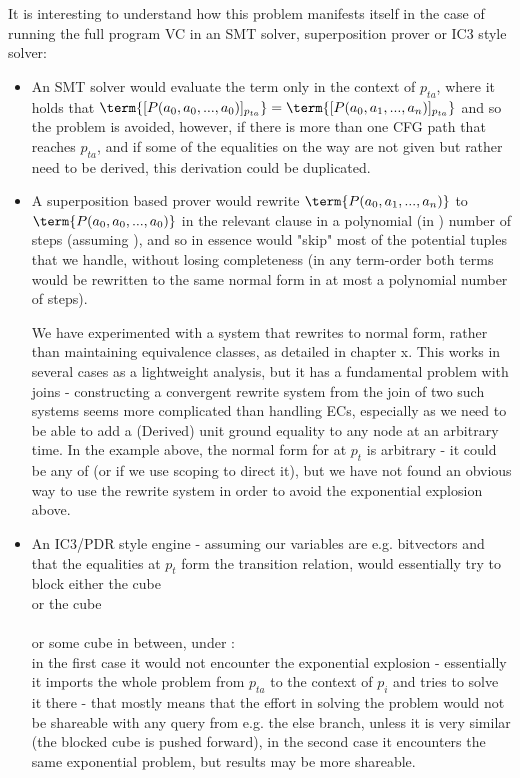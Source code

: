 It is interesting to understand how this problem manifests itself in the case of running the full program VC in an SMT solver, superposition prover or IC3 style solver:
\begin{itemize}
	\item An SMT solver would evaluate the term  only in the context of $p_{ta}$, where it holds that
	$\term{[P(a_0,a_0,...,a_0)]_{p_{ta}}}=\term{[P(a_0,a_1,...,a_n)]_{p_{ta}}}$ and so the problem is avoided, however, if there is more than one CFG path that reaches $p_{ta}$, and if some of the equalities on the way are not given but rather need to be derived, this derivation could be duplicated.
	\item A superposition based prover would rewrite $\term{P(a_0,a_1,...,a_n)}$ to \\ $\term{P(a_0,a_0,...,a_0)}$ in the relevant clause in a polynomial (in ) number of steps (assuming ), and so in essence would "skip" most of the potential tuples that we handle, without losing completeness (in any term-order both terms would be rewritten to the same normal form in at most a polynomial number of steps).
	
	We have experimented with a system that rewrites to normal form, rather than maintaining equivalence classes, as detailed in chapter x.
	This works in several cases as a lightweight analysis, but it has a fundamental problem with joins - constructing a convergent rewrite system from the join of two such systems seems more complicated than handling ECs, especially as we need to be able to add a (Derived) unit ground equality to any node at an arbitrary time. In the example above, the normal form for  at $p_t$ is arbitrary - it could be any of  (or  if we use scoping to direct it), but we have not found an obvious way to use the rewrite system in order to avoid the exponential explosion above.
		
	\item An IC3/PDR style engine - assuming our variables are e.g. bitvectors and that the equalities at $p_t$ form the transition relation, would essentially try to block either the cube \\
	 or the cube \\
	 \\
	or some cube in between, under  :\\
	in the first case it would not encounter the exponential explosion - essentially it imports the whole problem from $p_{ta}$ to the context of $p_i$ and tries to solve it there - that mostly means that the effort in solving the problem would not be shareable with any query from e.g. the else branch, unless it is very similar (the blocked cube is pushed forward), in the second case it encounters the same exponential problem, but results may be more shareable.
\end{itemize}


